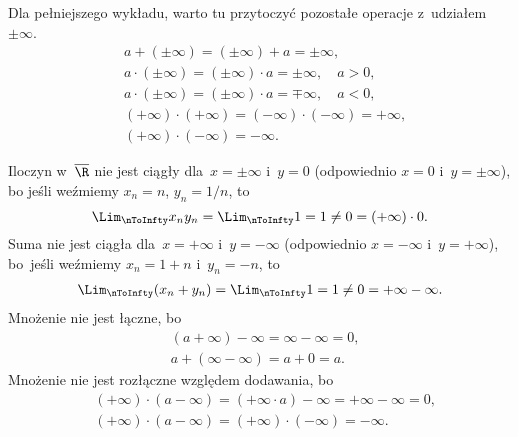 
\start {} Dla pełniejszego wykładu, warto tu przytoczyć pozostałe
operacje z~udziałem $\pm \infty$.
\begin{equation}
  \label{eq:Lojasiewicz-01}
  \begin{split}
    &a + ( \pm \infty ) = ( \pm \infty ) + a = \pm \infty, \\
    &a \cdot ( \pm \infty ) = ( \pm \infty ) \cdot a = \pm \infty,
    \quad a > 0, \\
    &a \cdot ( \pm \infty ) = ( \pm \infty ) \cdot a = \mp \infty,
    \quad a < 0, \\
    &( +\infty ) \cdot ( +\infty ) = ( -\infty ) \cdot ( -\infty )
    = +\infty, \\
    &( +\infty ) \cdot ( -\infty ) = -\infty.
  \end{split}
\end{equation}

\vspace{\spaceFour}


\start {} Iloczyn w~$\overline{ \R }$ nie jest ciągły
dla~$x = \pm \infty$ i~$y = 0$ (odpowiednio $x = 0$
i~$y = \pm \infty$), bo jeśli weźmiemy $x_{ n } = n$, $y_{ n } = 1/n$,
to
\begin{equation}
  \label{eq:Lojasiewicz-02}
  \Lim_{ \nToInfty } x_{ n } y_{ n } = \Lim_{ \nToInfty } 1 = 1 \neq 0
  = ( +\infty ) \cdot 0.
\end{equation}
Suma nie jest ciągła dla~$x = +\infty$ i~$y = -\infty$ (odpowiednio
$x = -\infty$ i~$y = +\infty$), bo~jeśli weźmiemy $x_{ n } = 1 + n$
i~$y_{ n } = -n$, to
\begin{equation}
  \label{eq:Lojasiewicz-03}
  \begin{split}
    \Lim_{ \nToInfty } ( x_{ n } + y_{ n } ) = \Lim_{ \nToInfty } 1 =
    1 \neq 0 = +\infty - \infty.
  \end{split}
\end{equation}
Mnożenie nie jest łączne, bo
\begin{equation}
  \label{eq:Lojasiewicz-04}
  \begin{split}
    &( a + \infty ) - \infty = \infty - \infty = 0, \\
    &a + ( \infty - \infty ) = a + 0 = a.
  \end{split}
\end{equation}
Mnożenie nie jest rozłączne względem dodawania, bo
\begin{equation}
  \label{eq:Lojasiewicz-05}
  \begin{split}
    &( +\infty ) \cdot ( a - \infty ) = ( +\infty \cdot a ) - \infty
    = +\infty - \infty = 0, \\
    &( +\infty ) \cdot ( a - \infty ) = ( +\infty ) \cdot ( -\infty )
    = -\infty.
  \end{split}
\end{equation}

